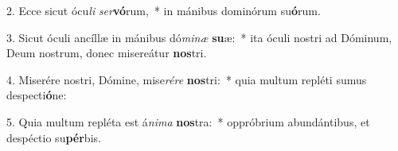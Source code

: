 2. Ecce sicut ócu\textit{li} \textit{ser}\textbf{vó}rum,~*  in mánibus dominórum su\textbf{ó}rum.\

3. Sicut óculi ancíllæ in mánibus dó\textit{mi}\textit{næ} \textbf{su}æ:~*  ita óculi nostri ad Dóminum, Deum nostrum, donec misereátur \textbf{nos}tri.\

4. Miserére nostri, Dómine, mise\textit{ré}\textit{re} \textbf{nos}tri:~*  quia multum repléti sumus despecti\textbf{ó}ne:\

5. Quia multum repléta est á\textit{ni}\textit{ma} \textbf{nos}tra:~*  oppróbrium abundántibus, et despéctio su\textbf{pér}bis.\


